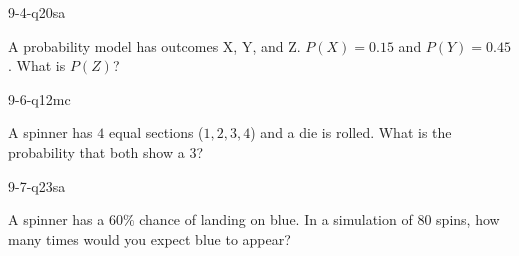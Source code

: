 \begin{practiceQuestion}{9-4-q20}{sa}
\begin{questionText}
A probability model has outcomes X, Y, and Z. $P(X) = 0.15$ and $P(Y) = 0.45$. What is $P(Z)$?
\end{questionText}
\end{practiceQuestion}

\begin{practiceQuestion}{9-6-q12}{mc}
\begin{questionText}
A spinner has $4$ equal sections ($1, 2, 3, 4$) and a die is rolled. What is the probability that both show a $3$?
\end{questionText}
\end{practiceQuestion}

\begin{practiceQuestion}{9-7-q23}{sa}
\begin{questionText}
A spinner has a $60\%$ chance of landing on blue. In a simulation of $80$ spins, how many times would you expect blue to appear?
\end{questionText}
\end{practiceQuestion}
